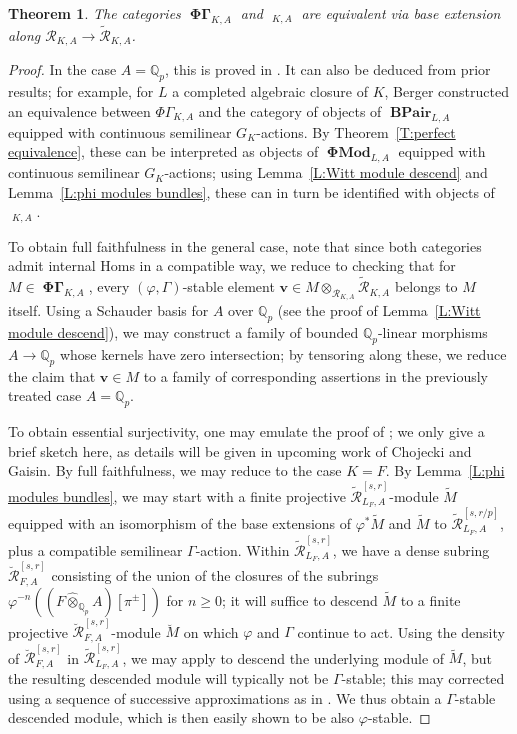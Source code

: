 \documentclass[12pt]{amsart}
\newtheorem{theorem}{Theorem}[section]
\theoremstyle{definition}
\numberwithin{equation}{theorem}
\newcommand{\bv}{\mathbf{v}}
\newcommand{\QQ}{\mathbb{Q}}
\newcommand{\calR}{\mathcal{R}}
\DeclareMathOperator{\BPair}{\mathbf{BPair}}
\DeclareMathOperator{\PhiGamma}{\mathbf{\Phi \Gamma}}
\DeclareMathOperator{\PhiGammatilde}{\widetilde{\mathbf{\Phi \Gamma}}}
\DeclareMathOperator{\PhiMod}{\mathbf{\Phi Mod}}
\begin{document}
\begin{theorem} \label{T:tilde no tilde}
The categories $\PhiGamma_{K,A}$ and $\PhiGammatilde_{K,A}$ are equivalent via base extension along $\calR_{K,A} \to \tilde{\calR}_{K,A}$.
\end{theorem}
\begin{proof}
In the case $A = \QQ_p$, this is proved in \cite[Theorem~6.1.7]{kedlaya-liu2}.
It can also be deduced from prior results; for example, for $L$ a completed algebraic closure of $K$, Berger \cite[Th\'eor\`eme~A]{berger-b-pairs} constructed an equivalence between $\Phi\Gamma_{K,A}$ and the category of objects of $\BPair_{L,A}$ equipped with continuous semilinear $G_K$-actions. By Theorem~\ref{T:perfect equivalence}, these can be interpreted as objects of $\PhiMod_{L,A}$ equipped with continuous semilinear $G_K$-actions;
using Lemma~\ref{L:Witt module descend} and Lemma~\ref{L:phi modules bundles}, these can in turn be identified with objects of $\PhiGammatilde_{K,A}$.

To obtain full faithfulness in the general case, note that since both categories admit internal Homs in a compatible way, we reduce to checking that for $M \in \PhiGamma_{K,A}$, every $(\varphi, \Gamma)$-stable element $\bv \in M \otimes_{\calR_{K,A}} \tilde{\calR}_{K,A}$ belongs to $M$ itself. Using a Schauder basis for $A$ over $\QQ_p$ (see the proof of Lemma~\ref{L:Witt module descend}), we may construct a family of bounded $\QQ_p$-linear morphisms
$A \to \QQ_p$ whose kernels have zero intersection; by tensoring along these, we reduce the claim that $\bv \in M$ to a family of corresponding assertions in the previously treated case $A = \QQ_p$.

To obtain essential surjectivity, one may emulate the proof of \cite[Theorem~6.1.7]{kedlaya-liu2}; we only give a brief sketch here, as details will be given in upcoming work of Chojecki and Gaisin. By full faithfulness, we may reduce to the case $K = F$.
By Lemma~\ref{L:phi modules bundles}, we may start with a finite projective $\tilde{\calR}^{[s,r]}_{L_F,A}$-module $\tilde{M}$ equipped with an isomorphism of the base extensions of $\varphi^* \tilde{M}$ and $\tilde{M}$ to $\tilde{\calR}^{[s,r/p]}_{L_F,A}$, plus a compatible semilinear $\Gamma$-action.
Within $\tilde{\calR}^{[s,r]}_{L_F,A}$, we have a dense subring $\breve{\calR}^{[s,r]}_{F,A}$ consisting of the union of the closures of
the subrings $\varphi^{-n}((F \widehat{\otimes}_{\QQ_p} A)[\pi^{\pm}])$ for $n \geq 0$; it will suffice to descend $\tilde{M}$ to a finite projective $\breve{\calR}^{[s,r]}_{F,A}$-module $\breve{M}$
on which $\varphi$ and $\Gamma$ continue to act. Using the density of
$\breve{\calR}^{[s,r]}_{F,A}$ in $\tilde{\calR}^{[s,r]}_{L_F,A}$, we may apply
\cite[Lemma 5.6.8]{kedlaya-liu2} to descend the underlying module of $\tilde{M}$, but the resulting descended module will typically not be $\Gamma$-stable; this may corrected using a sequence of successive approximations as in \cite[Lemma 5.6.9]{kedlaya-liu2}. We thus obtain a $\Gamma$-stable descended module, which is then easily shown to be also $\varphi$-stable.
\end{proof}
\end{document}
